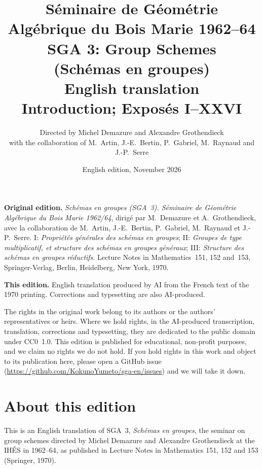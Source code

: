 \documentclass[11pt,a4paper,oneside]{book}
\title{S\'eminaire de G\'eom\'etrie Alg\'ebrique du Bois Marie 1962--64\\[0.6em]
  \LARGE SGA 3: Group Schemes\\[0.3em]
  \large (Sch\'emas en groupes)\\[1.2em]
  \normalsize English translation\\[0.2em]
  \small Introduction; Expos\'es I--XXVI}
\author{Directed by Michel Demazure and Alexandre Grothendieck\\[0.4em]
  \small with the collaboration of M.~Artin, J.-E.~Bertin, P.~Gabriel, M.~Raynaud and J.-P.~Serre}
\date{English edition, November 2026}
\theoremstyle{plain}
\theoremstyle{definition}
\theoremstyle{remark}
\begin{document}
\frontmatter
\maketitle
\clearpage
\thispagestyle{empty}
\null\vfill
\begingroup\small
\noindent\textbf{Original edition.} \textit{Sch\'emas en groupes (SGA~3). S\'eminaire de G\'eom\'etrie Alg\'ebrique du Bois Marie 1962/64}, dirig\'e par M.~Demazure et A.~Grothendieck, avec la collaboration de M.~Artin, J.-E.~Bertin, P.~Gabriel, M.~Raynaud et J.-P.~Serre. I: \textit{Propri\'et\'es g\'en\'erales des sch\'emas en groupes}; II: \textit{Groupes de type multiplicatif, et structure des sch\'emas en groupes g\'en\'eraux}; III: \textit{Structure des sch\'emas en groupes r\'eductifs}. Lecture Notes in Mathematics~151, 152 and~153, Springer-Verlag, Berlin, Heidelberg, New York, 1970.\par
\medskip
\noindent\textbf{This edition.} English translation produced by AI from the French text of the 1970 printing. Corrections and typesetting are also AI-produced.\par
\medskip
\noindent The rights in the original work belong to its authors or the authors' representatives or heirs. Where we hold rights, in the AI-produced transcription, translation, corrections and typesetting, they are dedicated to the public domain under CC0~1.0. This edition is published for educational, non-profit purposes, and we claim no rights we do not hold. If you hold rights in this work and object to its publication here, please open a GitHub issue (\url{https://github.com/KokunoYumeto/sga-en/issues}) and we will take it down.\par
\endgroup
\clearpage

\chapter*{About this edition}
This is an English translation of SGA~3, \emph{Sch\'emas en groupes}, the seminar on group schemes directed by Michel Demazure and Alexandre Grothendieck at the IH\'ES in 1962--64, as published in Lecture Notes in Mathematics 151, 152 and 153 (Springer, 1970).
\end{document}

